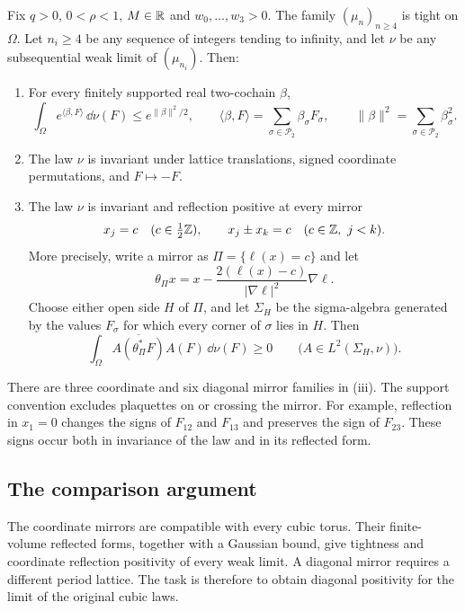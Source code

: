 \begin{theorem}\label{thm:main}\label{thm:cubic-limits}\label{thm:diag-lattice-limits}
Fix $q>0$, $0<\rho<1$, $M\in\mathbb R$ and $w_0,\ldots,w_3>0$.
The family $(\mu_n)_{n\ge4}$ is tight on $\Omega$. Let
$n_i\ge4$ be any sequence of integers tending to infinity, and let
$\nu$ be any subsequential weak limit of $(\mu_{n_i})$. Then:
\begin{enumerate}
\item[\textup{(i)}] For every finitely supported real two-cochain $\beta$,
\[
 \int_\Omega e^{\langle\beta,F\rangle}\,\dd\nu(F)
       \le e^{\|\beta\|^2/2},
 \qquad
 \langle\beta,F\rangle=\sum_{\sigma\in\mathcal P_2}\beta_\sigma F_\sigma,
 \qquad \|\beta\|^2=\sum_{\sigma\in\mathcal P_2}\beta_\sigma^2.
\]
\item[\textup{(ii)}] The law $\nu$ is invariant under lattice translations,
signed coordinate permutations, and $F\mapsto-F$.
\item[\textup{(iii)}] The law $\nu$ is invariant and reflection positive
at every mirror
\[
 x_j=c\quad(c\in\tfrac12\mathbb Z),\qquad
 x_j\pm x_k=c\quad(c\in\mathbb Z,\ j<k).
\]
More precisely, write a mirror as $\Pi=\{\ell(x)=c\}$ and let
\[
 \theta_\Pi x
 =x-\frac{2(\ell(x)-c)}{|\nabla\ell|^2}\nabla\ell.
\]
Choose either open side $H$ of $\Pi$, and let $\Sigma_H$ be the
sigma-algebra generated by the values $F_\sigma$ for which every
corner of $\sigma$ lies in $H$. Then
\[
 \int_\Omega\overline{A(\theta_\Pi^*F)}A(F)\,\dd\nu(F)\ge0
 \qquad\bigl(A\in L^2(\Sigma_H,\nu)\bigr).
\]
\end{enumerate}
\end{theorem}

There are three coordinate and six diagonal mirror families in
\textup{(iii)}. The support convention excludes plaquettes on or
crossing the mirror. For example, reflection in $x_1=0$ changes the
signs of $F_{12}$ and $F_{13}$ and preserves the sign of $F_{23}$.
These signs occur both in invariance of the law and in its reflected
form.

\subsection{The comparison argument}

The coordinate mirrors are compatible with every cubic torus. Their
finite-volume reflected forms, together with a Gaussian bound,
give tightness and coordinate reflection positivity of every weak
limit. A diagonal mirror requires a different period lattice.
The task is therefore to obtain diagonal positivity for the limit
of the original cubic laws.

